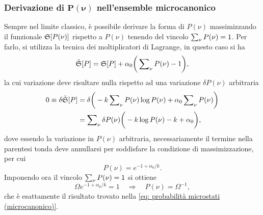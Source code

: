 \subsubsection{Derivazione di \texorpdfstring{$\bm{P(\nu)}$}{P(nu)} nell'ensemble microcanonico}
Sempre nel limite classico, è possibile derivare la forma di $P(\nu)$ massimizzando il funzionale $\mathfrak{S}[P(\nu)]$ rispetto a $P(\nu)$ tenendo del vincolo $\sum\nolimits_\nu P(\nu) = 1$. Per farlo, si utilizza la tecnica dei moltiplicatori di Lagrange, in questo caso si ha
\begin{equation}
    \tilde{\mathfrak{S}}[P] = \mathfrak{S}[P] + \alpha_0\bigg(\sum\nolimits_\nu P(\nu) - 1\bigg),
\end{equation}
la cui variazione deve risultare nulla rispetto ad una variazione $\delta P(\nu)$ arbitraria
\begin{equation}
    \begin{split}
        0 \equiv \delta\tilde{\mathfrak{S}}[P] &= \delta\bigg(-k\sum\nolimits_\nu P(\nu)\log{P(\nu)} + \alpha_0\sum\nolimits_\nu P(\nu)\bigg)  \\
        &= \sum\nolimits_\nu\delta P(\nu)\bigg(-k\log{P(\nu)} - k + \alpha_0\bigg),
    \end{split}
\end{equation}
dove essendo la variazione in $P(\nu)$ arbitraria, necessariamente il termine nella parentesi tonda deve annullarsi per soddisfare la condizione di massimizzazione, per cui
\begin{equation}
    P(\nu) = e^{-1 + \alpha_0/k}.
\end{equation}
Imponendo ora il vincolo $\sum\nolimits_\nu P(\nu) = 1$ si ottiene
\begin{equation}
    \Omega e^{-1 + \alpha_0/k} = 1\quad\Rightarrow\quad P(\nu) = \Omega^{-1},
\end{equation}
che è esattamente il risultato trovato nella \eqref{eq: probabilità microstati (microcanonico)}.

